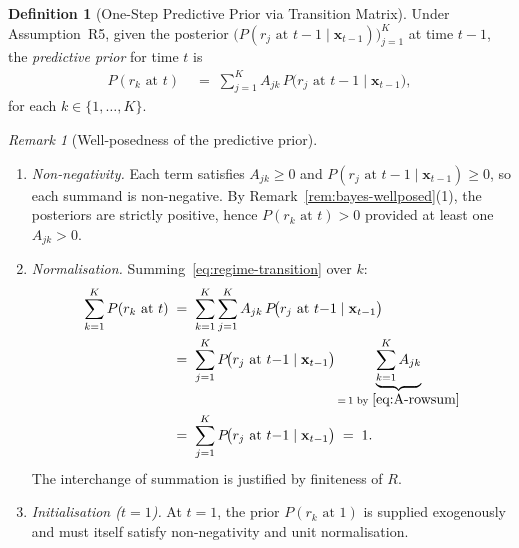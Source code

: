 \documentclass[12pt,openany]{book}
\newcommand{\bfx}{\mathbf{x}}
\numberwithin{equation}{chapter}
\theoremstyle{plain}
\theoremstyle{definition}
\newtheorem{definition}[theorem]{Definition}
\theoremstyle{remark}
\newtheorem{remark}[theorem]{Remark}
\numberwithin{equation}{chapter}
\theoremstyle{plain}
\newcommand{\calR}{\mathcal{R}}
\def\calR{R}%
\begin{document}
\begin{definition}[One-Step Predictive Prior via Transition Matrix]
\label{def:regime-transition}
Under Assumption~R5, given the posterior
$\bigl(P(r_j \text{ at } t{-}1 \mid \bfx_{t-1})\bigr)_{j=1}^{K}$
at time $t{-}1$, the \emph{predictive prior} for time $t$ is
\begin{align}
  P(r_k \text{ at } t)
  &\;=\;
  \sum_{j=1}^{K}
    A_{jk}\,P\!\bigl(r_j \text{ at } t{-}1 \mid \bfx_{t-1}\bigr),
  \label{eq:regime-transition}
\end{align}
for each $k \in \{1,\ldots,K\}$.
\end{definition}

\begin{remark}[Well-posedness of the predictive prior]
\label{rem:transition-wellposed}
\begin{enumerate}
  \item \emph{Non-negativity.}
        Each term satisfies $A_{jk} \geq 0$ and
        $P(r_j \text{ at } t{-}1 \mid \bfx_{t-1}) \geq 0$,
        so each summand is non-negative.  By
        Remark~\ref{rem:bayes-wellposed}(1), the posteriors
        are strictly positive, hence $P(r_k \text{ at } t) > 0$
        provided at least one $A_{jk} > 0$.
  \item \emph{Normalisation.}  Summing~\eqref{eq:regime-transition}
        over $k$:
        \begin{align}
          \sum_{k=1}^{K} P(r_k \text{ at } t)
          &\;=\;
          \sum_{k=1}^{K}\sum_{j=1}^{K}
            A_{jk}\,P\!\bigl(r_j \text{ at } t{-}1
                              \mid \bfx_{t-1}\bigr)
          \notag\\
          &\;=\;
          \sum_{j=1}^{K}
            P\!\bigl(r_j \text{ at } t{-}1 \mid \bfx_{t-1}\bigr)
            \underbrace{\sum_{k=1}^{K} A_{jk}}_{=\,1\;
              \text{by~}\eqref{eq:A-rowsum}}
          \notag\\
          &\;=\;
          \sum_{j=1}^{K}
            P\!\bigl(r_j \text{ at } t{-}1 \mid \bfx_{t-1}\bigr)
          \;=\; 1.
          \label{eq:transition-norm}
        \end{align}
        The interchange of summation is justified by
        finiteness of $\calR$.
  \item \emph{Initialisation ($t=1$).}
        At $t = 1$, the prior $P(r_k \text{ at } 1)$ is
        supplied exogenously and must itself satisfy
        non-negativity and unit normalisation.
\end{enumerate}
\end{remark}
\end{document}
